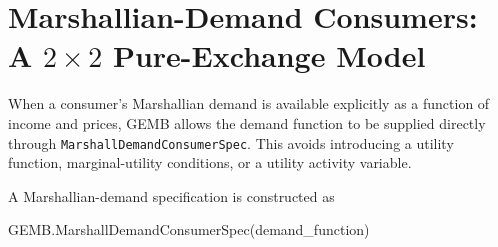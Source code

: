 \documentclass[
  letterpaper,
  DIV=11,
  numbers=noendperiod]{scrreprt}
\newenvironment{Shaded}{\begin{snugshade}}{\end{snugshade}}
\newcommand{\ConstantTok}[1]{\textcolor[rgb]{0.56,0.35,0.01}{#1}}
\newcommand{\FloatTok}[1]{\textcolor[rgb]{0.68,0.00,0.00}{#1}}
\newcommand{\FunctionTok}[1]{\textcolor[rgb]{0.28,0.35,0.67}{#1}}
\newcommand{\NormalTok}[1]{\textcolor[rgb]{0.00,0.23,0.31}{#1}}
\newcommand{\OperatorTok}[1]{\textcolor[rgb]{0.37,0.37,0.37}{#1}}
\newcommand{\SpecialCharTok}[1]{\textcolor[rgb]{0.37,0.37,0.37}{#1}}
\newcommand{\StringTok}[1]{\textcolor[rgb]{0.13,0.47,0.30}{#1}}
\begin{document}
%

\section{\texorpdfstring{Marshallian-Demand Consumers: A \(2\times2\)
Pure-Exchange
Model}{Marshallian-Demand Consumers: A 2\textbackslash times2 Pure-Exchange Model}}\label{marshallian-demand-consumers-a-2times2-pure-exchange-model}

When a consumer's Marshallian demand is available explicitly as a
function of income and prices, GEMB allows the demand function to be
supplied directly through \texttt{MarshallDemandConsumerSpec}. This
avoids introducing a utility function, marginal-utility conditions, or a
utility activity variable.

A Marshallian-demand specification is constructed as

\begin{Shaded}
\begin{Highlighting}[]
\NormalTok{GEMB.}\FunctionTok{MarshallDemandConsumerSpec}\NormalTok{(demand\_function)}
\end{Highlighting}
\end{Shaded}
\end{document}
